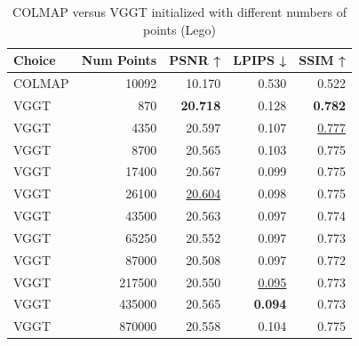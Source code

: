 \begin{table}[H]
\caption{COLMAP versus VGGT initialized with different numbers of points (Lego)}
\label{tab:02_num_points_lego}
\begin{tabular}{lrrrr}
\toprule
Choice & Num Points & PSNR ↑ & LPIPS ↓ & SSIM ↑ \\
\midrule
COLMAP & 10092 & 10.170 & 0.530 & 0.522 \\
VGGT & 870 & \textbf{20.718} & 0.128 & \textbf{0.782} \\
VGGT & 4350 & 20.597 & 0.107 & \underline{0.777} \\
VGGT & 8700 & 20.565 & 0.103 & 0.775 \\
VGGT & 17400 & 20.567 & 0.099 & 0.775 \\
VGGT & 26100 & \underline{20.604} & 0.098 & 0.775 \\
VGGT & 43500 & 20.563 & 0.097 & 0.774 \\
VGGT & 65250 & 20.552 & 0.097 & 0.773 \\
VGGT & 87000 & 20.508 & 0.097 & 0.772 \\
VGGT & 217500 & 20.550 & \underline{0.095} & 0.773 \\
VGGT & 435000 & 20.565 & \textbf{0.094} & 0.773 \\
VGGT & 870000 & 20.558 & 0.104 & 0.775 \\
\bottomrule
\end{tabular}
\end{table}
